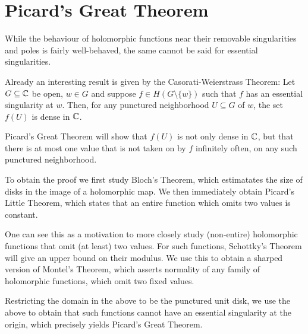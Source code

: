 \chapter{Picard's Great Theorem}
\label{ch:picards-great-theorem}

While the behaviour of holomorphic functions near their removable singularities and poles is fairly well-behaved, the same cannot be said for essential singularities.

Already an interesting result is given by the Casorati-Weierstrass Theorem: Let $G \subseteq \mathbb{C}$ be open, $w \in G$ and suppose $f \in H(G \setminus \{ w \})$ such that $f$ has an essential singularity at $w$. Then, for any punctured neighborhood $U \subseteq G$ of $w$, the set $f(U)$ is dense in $\mathbb{C}$.

Picard's Great Theorem will show that $f(U)$ is not only dense in $\mathbb{C}$, but that there is at most one value that is not taken on by $f$ infinitely often, on any such punctured neighborhood.

To obtain the proof we first study Bloch's Theorem, which estimatates the size of disks in the image of a holomorphic map. We then immediately obtain Picard's Little Theorem, which states that an entire function which omits two values is constant.

One can see this as a motivation to more closely study (non-entire) holomorphic functions that omit (at least) two values. For such functions, Schottky's Theorem will give an upper bound on their modulus. We use this to obtain a sharped version of Montel's Theorem, which asserts normality of any family of holomorphic functions, which omit two fixed values.

Restricting the domain in the above to be the punctured unit disk, we use the above to obtain that such functions cannot have an essential singularity at the origin, which precisely yields Picard's Great Theorem.




